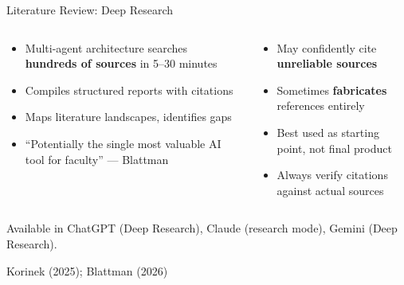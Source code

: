 \documentclass[aspectratio=169, 11pt]{beamer}
\newcommand{\emphgold}[1]{\alert{\textbf{#1}}}
\newcommand{\sourceref}[1]{\vspace{0.15cm}\hfill{\tiny\textcolor{medgray}{#1}}}
\begin{document}
\begin{frame}[shrink=12]{Literature Review: Deep Research}
\begin{columns}[T]
\begin{keyinsight}
\begin{itemize}
  \item Multi-agent architecture searches \emphgold{hundreds of sources} in 5--30 minutes
  \item Compiles structured reports with citations
  \item Maps literature landscapes, identifies gaps
  \item ``Potentially the single most valuable AI tool for faculty'' --- Blattman
\end{itemize}
\end{keyinsight}

\begin{warningbox}
\begin{itemize}
  \item May confidently cite \emphgold{unreliable sources}
  \item Sometimes \emphgold{fabricates} references entirely
  \item Best used as starting point, not final product
  \item Always verify citations against actual sources
\end{itemize}
\end{warningbox}
\end{columns}
\vspace{0.3cm}
\begin{center}
\small Available in ChatGPT (Deep Research), Claude (research mode), Gemini (Deep Research).
\end{center}
\sourceref{Korinek (2025); Blattman (2026)}
\end{frame}
\end{document}
